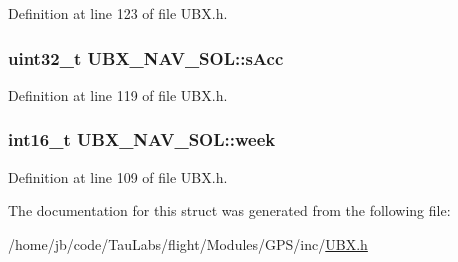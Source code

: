\-Definition at line 123 of file \-U\-B\-X.\-h.

\hypertarget{struct_u_b_x___n_a_v___s_o_l_a2f523fbe2cf2e2eeb885e5e54d633f17}{
\subsubsection[{s\-Acc}]{\setlength{\rightskip}{0pt plus 5cm}uint32\-\_\-t {\bf \-U\-B\-X\-\_\-\-N\-A\-V\-\_\-\-S\-O\-L\-::s\-Acc}}}\label{struct_u_b_x___n_a_v___s_o_l_a2f523fbe2cf2e2eeb885e5e54d633f17}


\-Definition at line 119 of file \-U\-B\-X.\-h.

\hypertarget{struct_u_b_x___n_a_v___s_o_l_aceeb9bd043b85b904f3a3bcfd1c2dc38}{
\subsubsection[{week}]{\setlength{\rightskip}{0pt plus 5cm}int16\-\_\-t {\bf \-U\-B\-X\-\_\-\-N\-A\-V\-\_\-\-S\-O\-L\-::week}}}\label{struct_u_b_x___n_a_v___s_o_l_aceeb9bd043b85b904f3a3bcfd1c2dc38}


\-Definition at line 109 of file \-U\-B\-X.\-h.



\-The documentation for this struct was generated from the following file\-:\begin{DoxyCompactItemize}
\item 
/home/jb/code/\-Tau\-Labs/flight/\-Modules/\-G\-P\-S/inc/\hyperlink{_u_b_x_8h}{\-U\-B\-X.\-h}\end{DoxyCompactItemize}
